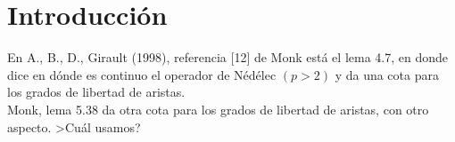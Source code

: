 \section{Introducci\'on} %
\label{sec:intro}
En A., B., D., Girault (1998), referencia [12] de Monk est\'a el
lema 4.7, en donde dice en d\'onde es continuo el operador de N\'ed\'elec $(p>2)$ y
da una cota para los grados de libertad de aristas.\\[5pt]
Monk, lema 5.38 da otra cota para los grados de libertad de aristas, con otro aspecto.
>Cu\'al usamos?
